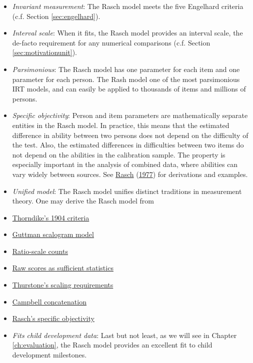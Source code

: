 \documentclass[
]{book}
\begin{document}
\begin{itemize}
\item
  \emph{Invariant measurement}: The Rasch model meets the five Engelhard criteria (c.f. Section \ref{sec:engelhard}).
\item
  \emph{Interval scale}: When it fits, the Rasch model provides an interval scale, the de-facto requirement for any numerical comparisons (c.f. Section \ref{sec:motivationunit}).
\item
  \emph{Parsimonious}: The Rasch model has one parameter for each item and one parameter for each person. The Rash model one of the most parsimonious IRT models, and can easily be applied to thousands of items and millions of persons.
\item
  \emph{Specific objectivity}: Person and item parameters are mathematically separate entities in the Rasch model. In practice, this means that the estimated difference in ability between two persons does not depend on the difficulty of the test. Also, the estimated differences in difficulties between two items do not depend on the abilities in the calibration sample. The property is especially important in the analysis of combined data, where abilities can vary widely between sources. See \protect\hyperlink{ref-rasch1977}{Rasch} (\protect\hyperlink{ref-rasch1977}{1977}) for derivations and examples.
\item
  \emph{Unified model}: The Rasch model unifies distinct traditions in measurement theory. One may derive the Rasch model from
\item
  \href{https://www.rasch.org/rmt/rmt143g.htm}{Thorndike's 1904 criteria}
\item
  \href{https://www.rasch.org/rmt/rmt63e.htm}{Guttman scalogram model}
\item
  \href{https://www.rasch.org/rmt/rmt62c.htm}{Ratio-scale counts}
\item
  \href{https://www.rasch.org/rmt/rmt32e.htm}{Raw scores as sufficient statistics}
\item
  \href{https://www.rasch.org/rmt/rmt21a.htm}{Thurstone's scaling requirements}
\item
  \href{https://www.rasch.org/rmt/rmt21b.htm}{Campbell concatenation}
\item
  \href{https://www.rasch.org/rmt/rmt11a.htm}{Rasch's specific objectivity}
\item
  \emph{Fits child development data}: Last but not least, as we will see in Chapter \ref{ch:evaluation}, the Rasch model provides an excellent fit to child development milestones.
\end{itemize}
\end{document}
